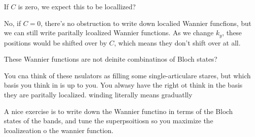 \begin{question}
    If $C$ is zero,
    we expect this to be locallized?
\end{question}
No,
if $C=0$,
there's no obstruction to write down localied Wannier funcfions,
but we can still write paritally lcoalized Wannier functions.
As we change $k_y$,
these positions would be shifted over by $C$,
which means they don't shift over at all.


\begin{question}
    These Wannier functions are not deinite combinatinos of Bloch states?
\end{question}
You cna think of these nsulators as filling some single-articulare stares,
but which basis you think in is up to you.
You alwasy have the right ot think in the basis they are paritally localized.
winding literally means graduatlly


A nice exercise is to write down the Wannier functino in terms of the Bloch
states of the bands,
and tune the superpsoitiosn so you maximize the lcoalizeation o the wannier
function.

